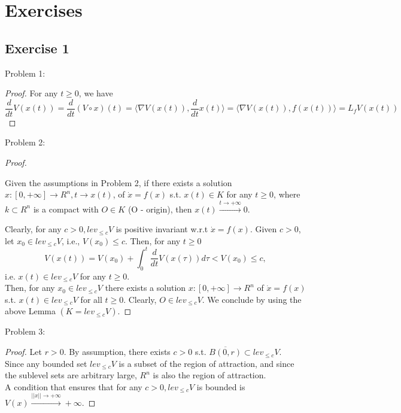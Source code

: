 \section{Exercises}

\subsection{Exercise 1}

Problem 1:
\begin{proof}
    For any $t \ge 0$, we have
    $$\frac{d}{dt}V(x(t)) = \frac{d}{dt}(V \circ x)(t) = \langle \nabla V(x(t)), \frac{d}{dt}x(t) \rangle = \langle \nabla V(x(t)),f(x(t)) \rangle = L_fV(x(t))$$
\end{proof}

Problem 2:
\begin{proof}
    \begin{Lemma}
        Given the assumptions in Problem 2, if there exists a solution $x: [ 0,+\infty ] \to R^n, t \to x(t)$, of $\dot x = f(x)$ s.t. $x(t) \in K$ for any $t \ge 0$, where $k \subset R^n$ is a compact with $O \in K$ (O - origin), then $x(t) \xrightarrow{t \to + \infty} 0.$
    \end{Lemma}
    
    Clearly, for any $c > 0, lev_{\le c}V$ is positive invariant w.r.t $\dot x = f(x)$. Given $c > 0$, let $x_0 \in lev_{\le c}V$, i.e., $V(x_0) \le c$. Then, for any $t \ge 0$
    $$V(x(t)) = V(x_0) + \int_0^t \frac{d}{dt}V(x(\tau))d\tau < V(x_0) \le c,$$
    i.e. $x(t) \in lev_{\le c}V$ for any $t \ge 0$. \\
    Then, for any $x_0 \in lev_{\le c}V$ there exists a solution $x: [ 0,+\infty ] \to R^n$ of $\dot x = f(x)$ s.t. $x(t) \in lev_{\le c}V$ for all $t \ge 0$.
    Clearly, $O \in lev_{\le c}V$. We conclude by using the above Lemma $(K = lev_{\le c}V)$.
\end{proof}

Problem 3:
\begin{proof}
    Let $r > 0$. By assumption, there exists $c > 0$ s.t. $\overline{B(0,r)} \subset lev_{\le c}V$. \\
    Since any bounded set $lev_{\le c}V$ is a subset of the region of attraction, and since the sublevel sets are arbitrary large, $R^n$ is also the region of attraction. \\
    A condition that ensures that for any $c > 0, lev_{\le c}V$ is bounded is $V(x) \xrightarrow{||x|| \to + \infty} + \infty$.
\end{proof}

